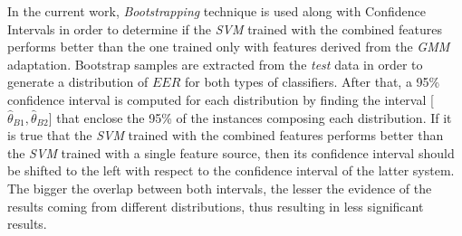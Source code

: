 In the current work, \textit{Bootstrapping} technique is used along with Confidence
Intervals in order to determine if the \textit{SVM} trained with the combined features
performs better than the one trained only with features derived from the \textit{GMM} adaptation.
Bootstrap samples are extracted from the \textit{test} data in order
to generate a distribution of $EER$ for both types of classifiers. After that,
a 95\% confidence interval is computed for each distribution by finding the interval
[$\hat{\theta}_{B1}, \hat{\theta}_{B2}$] that enclose the 95\% of the instances
composing each distribution.
If it is true that the \textit{SVM} trained with
the combined features performs better than the
\textit{SVM} trained with a single feature source, then its confidence
interval should be shifted to the left with respect to the confidence interval
of the latter system.
The bigger the overlap between both intervals, the
lesser the evidence of the results coming from different distributions, thus
resulting in less significant results.
